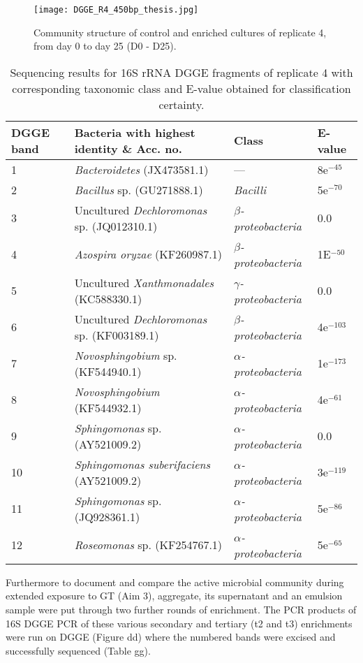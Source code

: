 \documentclass[11pt]{article}
\begin{document}
\begin{figure}
\texttt{[image: DGGE\_R4\_450bp\_thesis.jpg]}
\caption{Community structure of control and enriched cultures of replicate 4, from day 0 to day 25 (D0 - D25).}
\end{figure}

\begin{table}
\caption{Sequencing results for 16S rRNA DGGE fragments of replicate 4 with corresponding taxonomic class and E-value obtained for classification certainty.}
\begin{tabular}{ | l | p{7.8cm} | p{3cm} | l | }
\hline
DGGE band & Bacteria with highest identity \& Acc. no. & Class & E-value \\
\hline
1   &  \emph{Bacteroidetes} (JX473581.1) & --- & 8e$^{-45}$ \\
\hline
2  & \emph{Bacillus} sp. (GU271888.1) & \emph{Bacilli} & 5e$^{-70}$ \\
\hline
3 & Uncultured \emph{Dechloromonas} sp. (JQ012310.1) & \emph{$\beta$-proteobacteria} & 0.0 \\
\hline
4 & \emph{Azospira oryzae} (KF260987.1) & \emph{$\beta$-proteobacteria} & 1E$^{-50}$ \\
\hline
5 & Uncultured \emph{Xanthmonadales} (KC588330.1) & \emph{$\gamma$-proteobacteria} & 0.0 \\
\hline
6 & Uncultured \emph{Dechloromonas} sp. (KF003189.1) & \emph{$\beta$-proteobacteria} & 4e$^{-103}$ \\
\hline
7 & \emph{Novosphingobium} sp. (KF544940.1) & \emph{$\alpha$-proteobacteria} & 1e$^{-173}$ \\
\hline
8 & \emph{Novosphingobium} (KF544932.1) & \emph{$\alpha$-proteobacteria} & 4e$^{-61}$ \\
\hline
9 & \emph{Sphingomonas} sp. (AY521009.2) & \emph{$\alpha$-proteobacteria} & 0.0 \\
\hline
10 & \emph{Sphingomonas suberifaciens} (AY521009.2) & \emph{$\alpha$-proteobacteria} & 3e$^{-119}$ \\
\hline
11 & \emph{Sphingomonas} sp. (JQ928361.1) & \emph{$\alpha$-proteobacteria} & 5e$^{-86}$ \\
\hline
12 & \emph{Roseomonas} sp.  (KF254767.1) & \emph{$\alpha$-proteobacteria} & 5e$^{-65}$ \\
\hline
\end{tabular}

\end{table}
\FloatBarrier

Furthermore to document and compare the active microbial community during extended exposure to GT (Aim 3), aggregate, its supernatant and an emulsion sample were put through two further rounds of enrichment. The PCR products of 16S DGGE PCR of these various secondary and tertiary (t2 and t3) enrichments were run on DGGE (Figure dd) where the numbered bands were excised and successfully sequenced (Table gg). 
\end{document}
